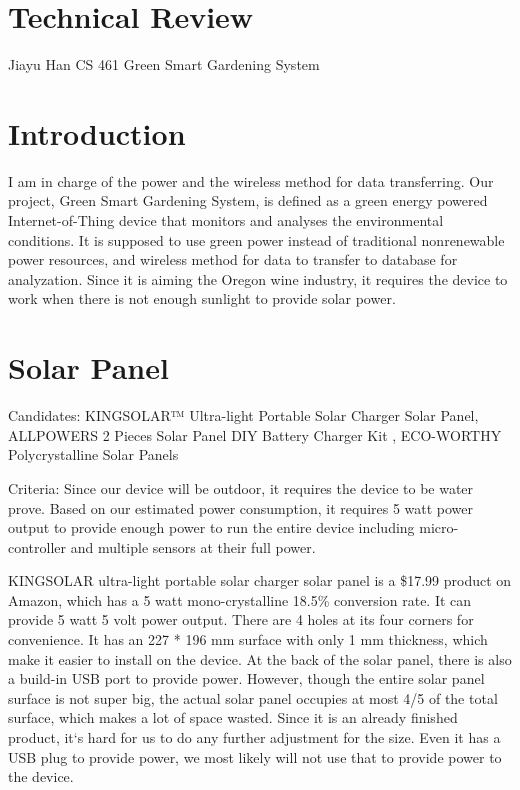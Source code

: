 \documentclass[letterpaper,10pt,titlepage]{article}
\begin{document}
\section{Technical Review}
	Jiayu Han
	CS 461
	Green Smart Gardening System

\section{Introduction}
	
I am in charge of the power and the wireless method for data transferring. Our project, Green Smart Gardening System, is defined as a green energy powered Internet-of-Thing device that monitors and analyses the environmental conditions. It is supposed to use green power instead of traditional nonrenewable power resources, and wireless method for data to transfer to database for analyzation. Since it is aiming the Oregon wine industry, it requires the device to work when there is not enough sunlight to provide solar power.


\section{Solar Panel}

Candidates: KINGSOLAR™ Ultra-light Portable Solar Charger Solar Panel, ALLPOWERS 2 Pieces Solar Panel DIY Battery Charger Kit , ECO-WORTHY Polycrystalline Solar Panels 

Criteria: Since our device will be outdoor, it requires the device to be water prove. Based on our estimated power consumption, it requires 5 watt power output to provide enough power to run the entire device including micro-controller and multiple sensors at their full power.


KINGSOLAR ultra-light portable solar charger solar panel is a \$17.99 product on Amazon, which has a 5 watt mono-crystalline 18.5\% conversion rate. It can provide 5 watt 5 volt power output. There are 4 holes at its four corners for convenience. It has an 227 * 196 mm surface with only 1 mm thickness, which make it easier to install on the device. At the back of the solar panel, there is also a build-in USB port to provide power. However, though the entire solar panel surface is not super big, the actual solar panel occupies at most 4/5 of the total surface, which makes a lot of space wasted. Since it is an already finished product, it`s hard for us to do any further adjustment for the size. Even it has a USB plug to provide power, we most likely will not use that to provide power to the device.
\end{document}
